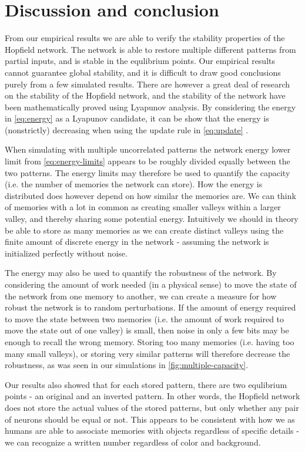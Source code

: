 \section{Discussion and conclusion}

From our empirical results we are able to verify the stability properties of the Hopfield network. The network is able to restore multiple different patterns from partial inputs, and is stable in the equlibrium points. Our empirical results cannot guarantee global stability, and it is difficult to draw good conclusions purely from a few simulated results. There are however a great deal of research on the stability of the Hopfield network, and the stability of the network have been mathematically proved using Lyapunov analysis. By considering the energy in \cref{eq:energy} as a Lyapunov candidate, it can be show that the energy is (nonstrictly) decreasing when using the update rule in \cref{eq:update} \cite{lyapnuv-stability}.


When simulating with multiple uncorrelated patterns the network energy lower limit from \cref{eq:energy-limits} appears to be roughly divided equally between the two patterns. The energy limits may therefore be used to quantify the capacity (i.e. the number of memories the network can store). How the energy is distributed does however depend on how similar the memories are. We can think of memories with a lot in common as creating smaller valleys within a larger valley, and thereby sharing some potential energy. Intuitively we should in theory be able to store as many memories as we can create distinct valleys using the finite amount of discrete energy in the network - assuming the network is initialized perfectly without noise.


The energy may also be used to quantify the robustness of the network. By considering the amount of work needed (in a physical sense) to move the state of the network from one memory to another, we can create a measure for how robust the network is to random perturbations. If the amount of energy required to move the state between two memories (i.e. the amount of work required to move the state out of one valley) is small, then noise in only a few bits may be enough to recall the wrong memory. Storing too many memories (i.e. having too many small valleys), or storing very similar patterns will therefore decrease the robustness, as was seen in our simulations in \cref{fig:multiple-capacity}.


Our results also showed that for each stored pattern, there are two equlibrium points - an original and an inverted pattern. In other words, the Hopfield network does not store the actual values of the stored patterns, but only whether any pair of neurons should be equal or not. This appears to be consistent with how we as humans are able to associate memories with objects regardless of specific details - we can recognize a written number regardless of color and background.


